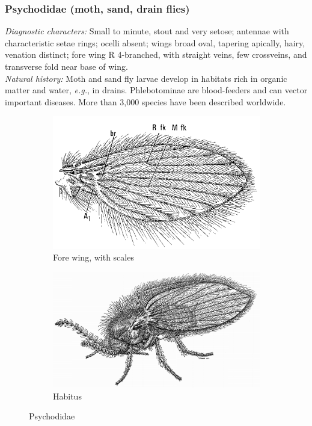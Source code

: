 \documentclass[letterpaper, 11pt]{article}
\begin{document}
\subsubsection{Psychodidae (moth, sand, drain flies)}
\noindent{}\textit{Diagnostic characters:} Small to minute, stout and very setose;  antennae with characteristic setae rings; ocelli absent; wings broad oval, tapering apically, hairy, venation distinct; fore wing R 4-branched, with straight veins, few crossveins, and transverse fold near base of wing.\\

\noindent{}\textit{Natural history:} Moth and sand fly larvae develop in habitats rich in organic matter and water, \textit{e.g.}, in drains. Phlebotominae are blood-feeders and can vector important diseases. More than 3,000 species have been described worldwide.

\begin{figure}[ht!]
    \centering
    \begin{subfigure}[ht!]{0.4\textwidth}
        \includegraphics[width=\textwidth]{PsychodidWing}
        \caption{Fore wing, with scales \citep[][Fig. 17.11]{mcalpine1981manual}}
        \label{fig:psychodid1}
    \end{subfigure}
    \qquad
    \begin{subfigure}[ht!]{0.45\textwidth}
        \includegraphics[width=\textwidth]{PsychodidHabitus}
        \caption{Habitus \citep[][Fig. 17.1]{mcalpine1981manual}}
        \label{fig:psychodid2}
    \end{subfigure}
    \caption{Psychodidae}\label{fig:psychodids}
\end{figure}
\end{document}
